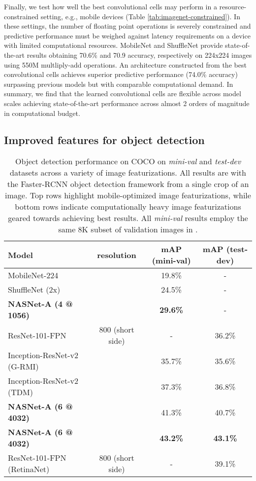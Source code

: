 Finally, we test how well the best convolutional cells may perform in a resource-constrained setting, e.g.,  mobile devices (Table \ref{tab:imagenet-constrained}). In these settings, the number of floating point operations is severely constrained and predictive performance must be weighed against latency requirements on a device with limited computational resources. MobileNet \cite{howard2017mobilenets} and ShuffleNet \cite{shufflenet} provide state-of-the-art results obtaining 70.6\% and 70.9 accuracy, respectively on 224x224 images using 550M multliply-add operations. An architecture constructed from the best convolutional cells  achieves superior predictive performance (74.0\% accuracy) surpassing previous models but with comparable computational demand. In summary, we find that the learned convolutional cells are flexible across model scales achieving state-of-the-art performance across almost 2 orders of magnitude in computational budget.



\subsection{Improved features for object detection}

\begin{table*}[h!]
\centering
\small
\begin{tabular}{lc|cc}
\toprule
{\bf Model} & {\bf resolution} & {\bf mAP (mini-val)} & {\bf mAP (test-dev)} \\
\midrule
MobileNet-224 \cite{howard2017mobilenets} &  & 19.8\% & -  \\
ShuffleNet (2x) \cite{shufflenet} &   & 24.5\% & - \\ 
\textbf{NASNet-A (4 @ 1056)} &  & \textbf{29.6\%} & - \\
\midrule
ResNet-101-FPN \cite{lin2016feature} & 800 (short side) & - & 36.2\% \\
Inception-ResNet-v2 (G-RMI) \cite{huang2016speed} &  & 35.7\% & 35.6\% \\
Inception-ResNet-v2 (TDM) \cite{shrivastava2016beyond} &  & 37.3\% & 36.8\% \\
\textbf{NASNet-A (6 @ 4032)} &  & 41.3\% & 40.7\% \\
\textbf{NASNet-A (6 @ 4032)} &  & \textbf{43.2\%} & {\bf 43.1\%} \\
\midrule
ResNet-101-FPN (RetinaNet) \cite{lin2017focal} & 800 (short side) & - & 39.1\%  \\
\bottomrule
\end{tabular}
\vspace{0.2cm}
\caption{Object detection performance on COCO on {\it mini-val} and {\it test-dev} datasets across a variety of image featurizations. All results are with the Faster-RCNN object detection framework \cite{faster_rcnn} from a single crop of an image. Top rows highlight mobile-optimized image featurizations, while bottom rows indicate computationally heavy image featurizations geared towards achieving best results. All {\it mini-val} results employ the same 8K subset of validation images in \cite{huang2016speed}.}
\label{table:mscoco}
\end{table*}



